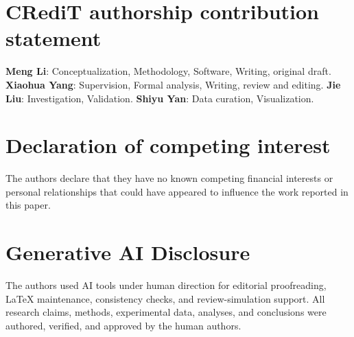 \documentclass[manuscript,screen,review]{acmart}
\begin{document}
\section*{CRediT authorship contribution statement}

\textbf{Meng Li}: Conceptualization, Methodology, Software, Writing, original
draft. \textbf{Xiaohua Yang}: Supervision, Formal analysis, Writing, review
and editing. \textbf{Jie Liu}: Investigation, Validation. \textbf{Shiyu Yan}:
Data curation, Visualization.

\section*{Declaration of competing interest}

The authors declare that they have no known competing financial interests or
personal relationships that could have appeared to influence the work reported
in this paper.

\section*{Generative AI Disclosure}

The authors used AI tools under human direction for editorial proofreading,
LaTeX maintenance, consistency checks, and review-simulation support. All
research claims, methods, experimental data, analyses, and conclusions were
authored, verified, and approved by the human authors.



\end{document}
